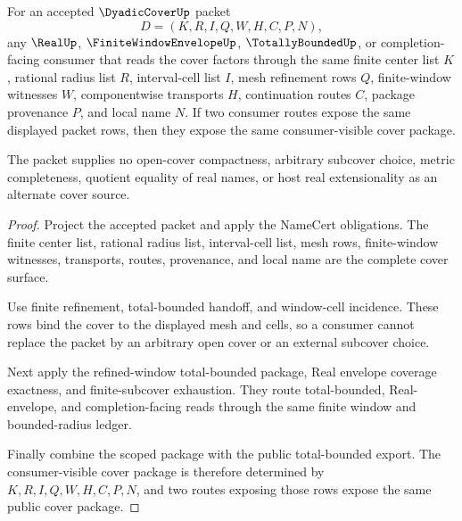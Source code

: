 \begin{theorem}
\label{thm:dyadic-cover-finite-cover-consumer-determinacy}
For an accepted $\DyadicCoverUp$ packet
$$
D=(K,R,I,Q,W,H,C,P,N),
$$
any $\RealUp$, $\FiniteWindowEnvelopeUp$, $\TotallyBoundedUp$, or completion-facing consumer that reads the cover factors through the same finite center list $K$, rational radius list $R$, interval-cell list $I$, mesh refinement rows $Q$, finite-window witnesses $W$, componentwise transports $H$, continuation routes $C$, package provenance $P$, and local name $N$. If two consumer routes expose the same displayed packet rows, then they expose the same consumer-visible cover package.

The packet supplies no open-cover compactness, arbitrary subcover choice, metric completeness, quotient equality of real names, or host real extensionality as an alternate cover source.
\end{theorem}
\begin{proof}
Project the accepted packet and apply the NameCert obligations. The finite center list, rational radius list, interval-cell list, mesh rows, finite-window witnesses, transports, routes, provenance, and local name are the complete cover surface.

Use finite refinement, total-bounded handoff, and window-cell incidence. These rows bind the cover to the displayed mesh and cells, so a consumer cannot replace the packet by an arbitrary open cover or an external subcover choice.

Next apply the refined-window total-bounded package, Real envelope coverage exactness, and finite-subcover exhaustion. They route total-bounded, Real-envelope, and completion-facing reads through the same finite window and bounded-radius ledger.

Finally combine the scoped package with the public total-bounded export. The consumer-visible cover package is therefore determined by $K,R,I,Q,W,H,C,P,N$, and two routes exposing those rows expose the same public cover package.
\end{proof}



